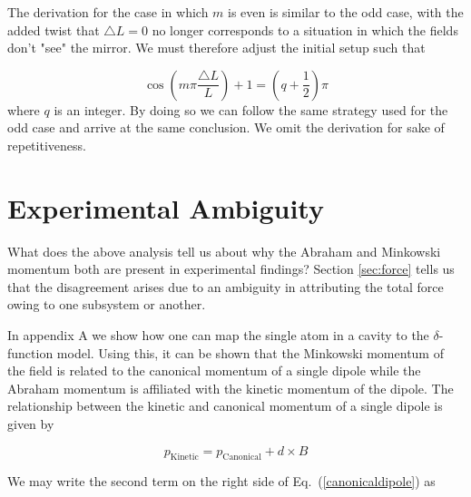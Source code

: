 The derivation for the case in which $m$ is even is similar to the odd case, with the added twist that $\triangle L=0$ no longer corresponds to a situation in which the fields don't "see" the mirror.  We must therefore adjust the initial setup such that

\begin{equation}
\cos(m\pi\frac{\triangle L}{L})+1=(q+\frac{1}{2})\pi
\label{wavenumbereqn}
\end{equation}
where $q$ is an integer.  By doing so we can follow the same strategy used for the odd case and arrive at the same conclusion.  We omit the derivation for sake of repetitiveness.


\section{Experimental Ambiguity}
\label{sec:experiment}


What does the above analysis tell us about why the Abraham and Minkowski momentum both are present in experimental findings?  Section \ref{sec:force} tells us that the disagreement arises due to an ambiguity in attributing the total force owing to one subsystem or another.  

In appendix A we show how one can map the single atom in a cavity to the $\delta$-function model.  Using this, it can be shown that the Minkowski momentum of the field is related to the canonical momentum of a single dipole while the Abraham momentum is affiliated with the kinetic momentum of the dipole.  The relationship between the kinetic and canonical momentum of a single dipole is given by \cite{hinds}

\begin{equation}
p_{\mathrm{Kinetic}}=p_{\mathrm{Canonical}}+d \times B
\label{canonicaldipole}
\end{equation}
 
We may write the second term on the right side of Eq.\ (\ref{canonicaldipole}) as 

